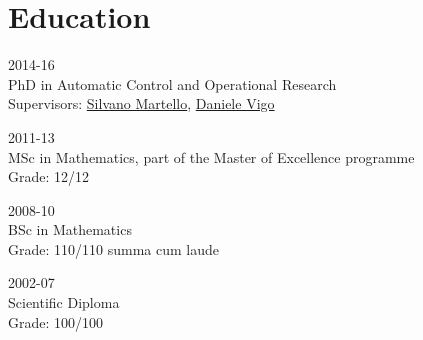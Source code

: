 \section*{Education}

\begin{paracol}{2}
  \textsc{2014-16}
\switchcolumn
  \\
  PhD in Automatic Control and Operational Research\\
  Supervisors: \href{https://scholar.google.com/citations?user=o4a20zsAAAAJ}{Silvano Martello}, \href{https://scholar.google.com/citations?user=2kk8d_AAAAAJ}{Daniele Vigo}
\end{paracol}

\begin{paracol}{2}
  \textsc{2011-13}
\switchcolumn
  \\
  MSc in Mathematics, part of the Master of Excellence programme\\
  Grade: 12/12
\end{paracol}

\begin{paracol}{2}
  \textsc{2008-10}
\switchcolumn
  \\
  BSc in Mathematics\\
  Grade: 110/110 summa cum laude
\end{paracol}

\begin{paracol}{2}
  \textsc{2002-07}
\switchcolumn
  \\
  Scientific Diploma\\
  Grade: 100/100
\end{paracol}
